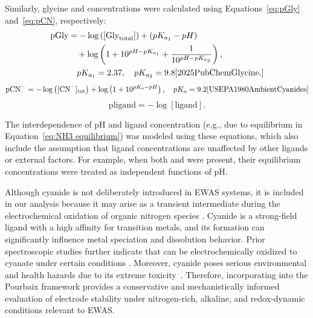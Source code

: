 \documentclass[journal=jacsat,manuscript=article]{achemso}
\begin{document}
Similarly, glycine and  concentrations were calculated using Equations~\eqref{eq:pGly} and~\eqref{eq:pCN}, respectively:
\begin{align} \label{eq:pGly}
\text{pGly} &= -\log \left([\text{Gly}_{\text{total}}]\right) + (pK_{a_1} - pH) \nonumber \\
&\quad + \log \left(1 + 10^{pH - pK_{a_1}} + \frac{1}{10^{pH - pK_{a_2}}} \right), \nonumber \\
&\quad pK_{a_1} = 2.37, \quad pK_{a_2} = 9.8 \cite{2025PubChemGlycine.}
\end{align}
\begin{equation} \label{eq:pCN}
\text{pCN}^- = -\log \left([\text{CN}^-]_{\text{tot}}\right) + \log \left(1 + 10^{pK_a - pH} \right), \quad pK_a = 9.2 \cite{USEPA1980AmbientCyanides}
\end{equation}
\begin{equation} \label{eq:pligand}
\text{pligand} = -\log[\text{ligand}].
\end{equation}

The interdependence of pH and ligand concentration (e.g., due to  equilibrium in Equation~\eqref{eq:NH3 equilibrium}) was modeled using these equations, which also include the assumption that ligand concentrations are unaffected by other ligands or external factors. For example, when both  and  were present, their equilibrium concentrations were treated as independent functions of pH.


Although cyanide is not deliberately introduced in EWAS systems, it is included in our analysis because it may arise as a transient intermediate during the electrochemical oxidation of organic nitrogen species \cite{Oraby2020GoldPermanganate, Chen2013AdsorptionStudy, Huerta1997ElectrochemicalPt111, Sandoval2011AdsorptionStudy}. Cyanide is a strong-field ligand with a high affinity for transition metals, and its formation can significantly influence metal speciation and dissolution behavior. Prior spectroscopic studies further indicate that  can be electrochemically oxidized to cyanate under certain conditions \cite{Paulissen1992InfraredConditions, Hinman1986FourierElectrodes, Kitamura1986OxidationSpectroscopy, Chen2013AdsorptionStudy}. Moreover, cyanide poses serious environmental and health hazards due to its extreme toxicity~\cite{xing2018simple, mekuto2016integrated, bruger2018volatilisation}. Therefore, incorporating  into the Pourbaix framework provides a conservative and mechanistically informed evaluation of electrode stability under nitrogen-rich, alkaline, and redox-dynamic conditions relevant to EWAS.
\end{document}
